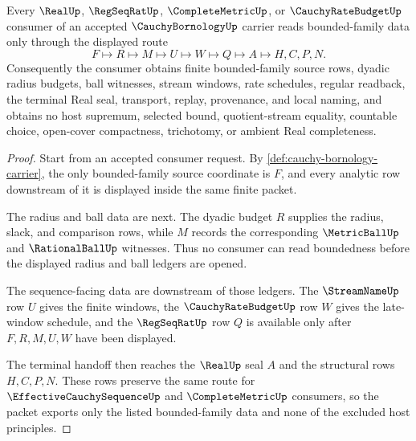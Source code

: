 \begin{theorem}
\label{thm:cauchy-bornology-completion-handoff}
Every $\RealUp$, $\RegSeqRatUp$, $\CompleteMetricUp$, or $\CauchyRateBudgetUp$ consumer of an accepted $\CauchyBornologyUp$ carrier reads bounded-family data only through the displayed route
$$
F \longmapsto R \longmapsto M \longmapsto U \longmapsto W \longmapsto Q \longmapsto A \longmapsto H,C,P,N .
$$
Consequently the consumer obtains finite bounded-family source rows, dyadic radius budgets, ball witnesses, stream windows, rate schedules, regular readback, the terminal Real seal, transport, replay, provenance, and local naming, and obtains no host supremum, selected bound, quotient-stream equality, countable choice, open-cover compactness, trichotomy, or ambient Real completeness.
\end{theorem}
\begin{proof}
Start from an accepted consumer request. By \autoref{def:cauchy-bornology-carrier}, the only bounded-family source coordinate is $F$, and every analytic row downstream of it is displayed inside the same finite packet.

The radius and ball data are next. The dyadic budget $R$ supplies the radius, slack, and comparison rows, while $M$ records the corresponding $\MetricBallUp$ and $\RationalBallUp$ witnesses. Thus no consumer can read boundedness before the displayed radius and ball ledgers are opened.

The sequence-facing data are downstream of those ledgers. The $\StreamNameUp$ row $U$ gives the finite windows, the $\CauchyRateBudgetUp$ row $W$ gives the late-window schedule, and the $\RegSeqRatUp$ row $Q$ is available only after $F,R,M,U,W$ have been displayed.

The terminal handoff then reaches the $\RealUp$ seal $A$ and the structural rows $H,C,P,N$. These rows preserve the same route for $\EffectiveCauchySequenceUp$ and $\CompleteMetricUp$ consumers, so the packet exports only the listed bounded-family data and none of the excluded host principles.
\end{proof}


